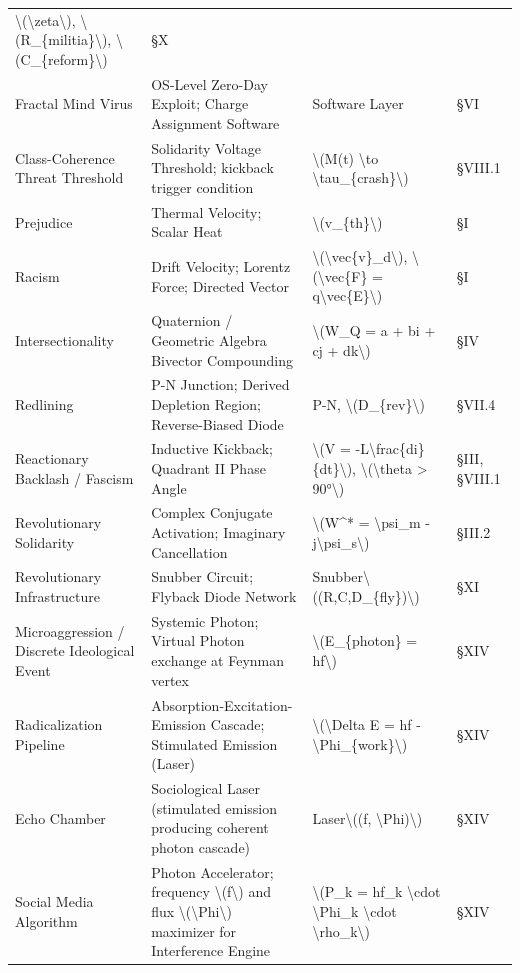 {{\begin{longtable}[]{@{}llll@{}}
\textbackslash(\textbackslash zeta\textbackslash),
\textbackslash(R\_\{militia\}\textbackslash),
\textbackslash(C\_\{reform\}\textbackslash) & §X \\
Fractal Mind Virus & OS-Level Zero-Day Exploit; Charge Assignment
Software & Software Layer & §VI \\
Class-Coherence Threat Threshold & Solidarity Voltage Threshold;
kickback trigger condition & \textbackslash(M(t) \textbackslash to
\textbackslash tau\_\{crash\}\textbackslash) & §VIII.1 \\
Prejudice & Thermal Velocity; Scalar Heat &
\textbackslash(v\_\{th\}\textbackslash) & §I \\
Racism & Drift Velocity; Lorentz Force; Directed Vector &
\textbackslash(\textbackslash vec\{v\}\_d\textbackslash),
\textbackslash(\textbackslash vec\{F\} =
q\textbackslash vec\{E\}\textbackslash) & §I \\
Intersectionality & Quaternion / Geometric Algebra Bivector Compounding
& \textbackslash(W\_Q = a + bi + cj + dk\textbackslash) & §IV \\
Redlining & P-N Junction; Derived Depletion Region; Reverse-Biased Diode
& P-N, \textbackslash(D\_\{rev\}\textbackslash) & §VII.4 \\
Reactionary Backlash / Fascism & Inductive Kickback; Quadrant II Phase
Angle & \textbackslash(V =
-L\textbackslash frac\{di\}\{dt\}\textbackslash),
\textbackslash(\textbackslash theta \textgreater{} 90°\textbackslash) &
§III, §VIII.1 \\
Revolutionary Solidarity & Complex Conjugate Activation; Imaginary
Cancellation & \textbackslash(W\^{}* = \textbackslash psi\_m -
j\textbackslash psi\_s\textbackslash) & §III.2 \\
Revolutionary Infrastructure & Snubber Circuit; Flyback Diode Network &
Snubber\textbackslash((R,C,D\_\{fly\})\textbackslash) & §XI \\
Microaggression / Discrete Ideological Event & Systemic Photon; Virtual
Photon exchange at Feynman vertex & \textbackslash(E\_\{photon\} =
hf\textbackslash) & §XIV \\
Radicalization Pipeline & Absorption-Excitation-Emission Cascade;
Stimulated Emission (Laser) & \textbackslash(\textbackslash Delta E = hf
- \textbackslash Phi\_\{work\}\textbackslash) & §XIV \\
Echo Chamber & Sociological Laser (stimulated emission producing
coherent photon cascade) & Laser\textbackslash((f,
\textbackslash Phi)\textbackslash) & §XIV \\
Social Media Algorithm & Photon Accelerator; frequency
\textbackslash(f\textbackslash) and flux
\textbackslash(\textbackslash Phi\textbackslash) maximizer for
Interference Engine & \textbackslash(P\_k = hf\_k \textbackslash cdot
\textbackslash Phi\_k \textbackslash cdot
\textbackslash rho\_k\textbackslash) & §XIV \\
\end{longtable}
}

}
